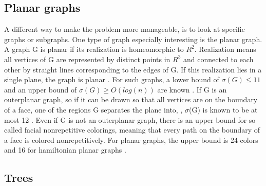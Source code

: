 \documentclass[12pt,a4paper]{article}
\begin{document}
\subsection{Planar graphs}

A different way to make the problem more manageable, is to look at specific graphs or subgraphs. One type of graph especially interesting is the planar graph. A graph G is planar if its realization is homeomorphic to $R^2$. Realization means all vertices of G are represented by distinct points in $R^3$ and connected to each other by straight lines corresponding to the edges of G. If this realization lies in a single plane, the graph is planar \citep[p. 21]{Bollobas1998}. For such graphs, a lower bound of $\sigma(G) \leq 11$ and an upper bound of $\sigma(G) \geq O(log(n))$ are known \citep{Dujmovic2012}. If G is an outerplanar graph, so if it can be drawn so that all vertices are on the boundary of a face, one of the regions G separates the plane into, \citep[p. 36]{Bollobas1998}, $\sigma$(G) is known to be at most 12 \citep{Barat2007}. Even if G is not an outerplanar graph, there is an upper bound for so called facial nonrepetitive colorings, meaning that every path on the boundary of a face is colored nonrepetitively. For planar graphs, the upper bound is 24 colors \citep{Barat2013} and 16 for hamiltonian planar graphs \citep{Harant2011}. 

\subsection{Trees}
\end{document}
